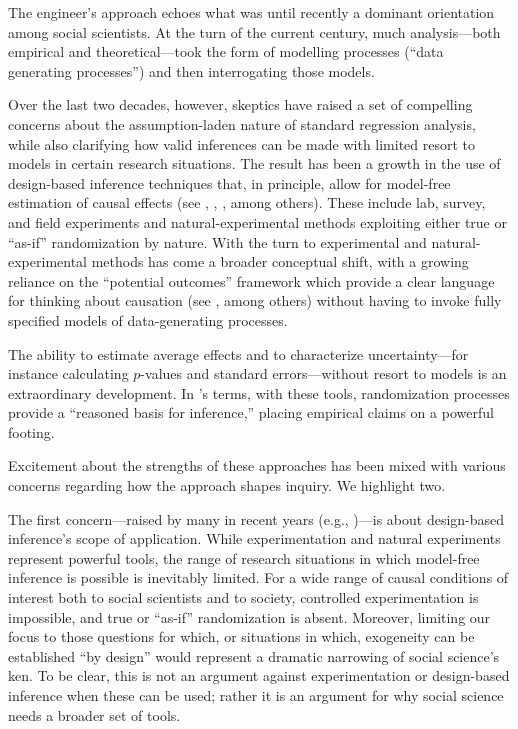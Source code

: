\documentclass[
  12pt,
]{book}
\begin{document}
The engineer's approach echoes what was until recently a dominant orientation among social scientists. At the turn of the current century, much analysis---both empirical and theoretical---took the form of modelling processes (``data generating processes'') and then interrogating those models.

Over the last two decades, however, skeptics have raised a set of compelling concerns about the assumption-laden nature of standard regression analysis, while also clarifying how valid inferences can be made with limited resort to models in certain research situations. The result has been a growth in the use of design-based inference techniques that, in principle, allow for model-free estimation of causal effects (see \citet{dunning2012natural}, \citet{GerGreKap04}, \citet{druckman2011experimentation}, \citet{palfrey2009laboratory} among others). These include lab, survey, and field experiments and natural-experimental methods exploiting either true or ``as-if'' randomization by nature. With the turn to experimental and natural-experimental methods has come a broader conceptual shift, with a growing reliance on the ``potential outcomes'' framework which provide a clear language for thinking about causation (see \citet{Rubin1974}, \citet{splawa1990application} among others) without having to invoke fully specified models of data-generating processes.

The ability to estimate average effects and to characterize uncertainty---for instance calculating \(p\)-values and standard errors---without resort to models is an extraordinary development. In \citet{fisher1935design}'s terms, with these tools, randomization processes provide a ``reasoned basis for inference,'' placing empirical claims on a powerful footing.

Excitement about the strengths of these approaches has been mixed with various concerns regarding how the approach shapes inquiry. We highlight two.

The first concern---raised by many in recent years (e.g., \citet{thelen2015comparative})---is about design-based inference's scope of application. While experimentation and natural experiments represent powerful tools, the range of research situations in which model-free inference is possible is inevitably limited. For a wide range of causal conditions of interest both to social scientists and to society, controlled experimentation is impossible, and true or ``as-if'' randomization is absent. Moreover, limiting our focus to those questions for which, or situations in which, exogeneity can be established ``by design'' would represent a dramatic narrowing of social science's ken. To be clear, this is not an argument against experimentation or design-based inference when these can be used; rather it is an argument for why social science needs a broader set of tools.
\end{document}
